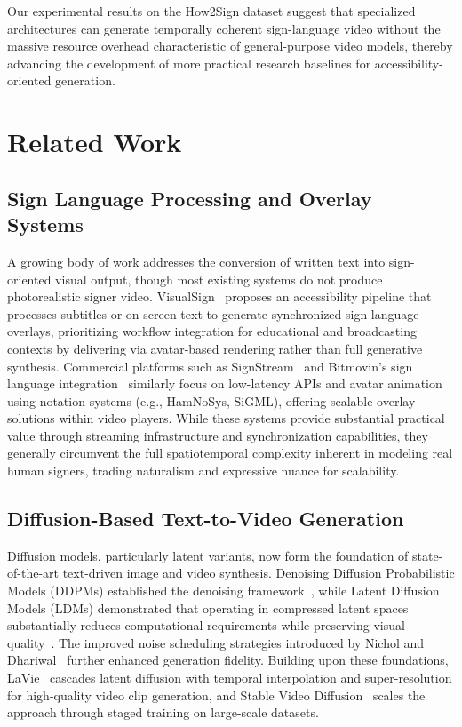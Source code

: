\documentclass{ieeeaccess}
\begin{document}
Our experimental results on the How2Sign dataset suggest that specialized architectures can generate temporally coherent sign-language video without the massive resource overhead characteristic of general-purpose video models, thereby advancing the development of more practical research baselines for accessibility-oriented generation.

\section{Related Work}
\label{sec:related_work}

\subsection{Sign Language Processing and Overlay Systems}

A growing body of work addresses the conversion of written text into sign-oriented visual output, though most existing systems do not produce photorealistic signer video. VisualSign~\cite{springer2024visualsign} proposes an accessibility pipeline that processes subtitles or on-screen text to generate synchronized sign language overlays, prioritizing workflow integration for educational and broadcasting contexts by delivering via avatar-based rendering rather than full generative synthesis. Commercial platforms such as SignStream~\cite{signapse2025signstream} and Bitmovin's sign language integration~\cite{bitmovin2024signlanguage} similarly focus on low-latency APIs and avatar animation using notation systems (e.g., HamNoSys, SiGML), offering scalable overlay solutions within video players. While these systems provide substantial practical value through streaming infrastructure and synchronization capabilities, they generally circumvent the full spatiotemporal complexity inherent in modeling real human signers, trading naturalism and expressive nuance for scalability.

\subsection{Diffusion-Based Text-to-Video Generation}

Diffusion models, particularly latent variants, now form the foundation of state-of-the-art text-driven image and video synthesis. Denoising Diffusion Probabilistic Models (DDPMs) established the denoising framework~\cite{ho2020ddpm}, while Latent Diffusion Models (LDMs) demonstrated that operating in compressed latent spaces substantially reduces computational requirements while preserving visual quality~\cite{rombach2022ldm}. The improved noise scheduling strategies introduced by Nichol and Dhariwal~\cite{nichol2021improved} further enhanced generation fidelity. Building upon these foundations, LaVie~\cite{zhang2023lavie} cascades latent diffusion with temporal interpolation and super-resolution for high-quality video clip generation, and Stable Video Diffusion~\cite{blattmann2023svd} scales the approach through staged training on large-scale datasets.
\end{document}
